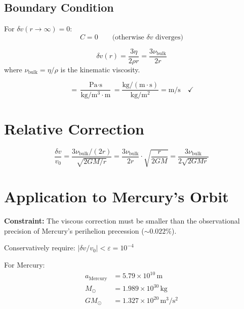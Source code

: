 \documentclass[12pt,a4paper,openany]{book}
\theoremstyle{definition}
\theoremstyle{plain}
\theoremstyle{remark}
\newcommand{\nubulk}{\nu_{\text{bulk}}}    %
\begin{document}
\subsection{Boundary Condition}

For $\delta v(r \to \infty) = 0$:
\begin{equation}
C = 0 \qquad \text{(otherwise $\delta v$ diverges)}
\end{equation}

\begin{derivedbox}
\begin{equation}
\boxed{\delta v(r) = \frac{3\eta}{2\rho r} = \frac{3\nubulk}{2r}}
\label{eq:delta_v_final}
\end{equation}
where $\nubulk = \eta/\rho$ is the kinematic viscosity.
\end{derivedbox}

\begin{dimcheckbox}
\begin{equation}
[\frac{\eta}{\rho r}] = \frac{\text{Pa}\cdot\text{s}}{\text{kg}/\text{m}^3 \cdot \text{m}} = \frac{\text{kg}/(\text{m}\cdot\text{s})}{\text{kg}/\text{m}^2} = \text{m/s} \quad \checkmark
\end{equation}
\end{dimcheckbox}

\section{Relative Correction}

\begin{equation}
\frac{\delta v}{v_0} = \frac{3\nubulk/(2r)}{\sqrt{2GM/r}} = \frac{3\nubulk}{2r} \cdot \sqrt{\frac{r}{2GM}} = \frac{3\nubulk}{2\sqrt{2GMr}}
\label{eq:relative_correction}
\end{equation}

\section{Application to Mercury's Orbit}

\textbf{Constraint:} The viscous correction must be smaller than the observational precision of Mercury's perihelion precession ($\sim 0.022\%$).

Conservatively require: $|\delta v/v_0| < \varepsilon = 10^{-4}$

For Mercury:
\begin{align}
a_{\text{Mercury}} &= 5.79 \times 10^{10}\,\text{m} \\
M_\odot &= 1.989 \times 10^{30}\,\text{kg} \\
GM_\odot &= 1.327 \times 10^{20}\,\text{m}^3/\text{s}^2
\end{align}
\end{document}
